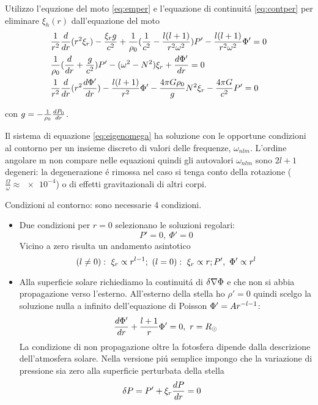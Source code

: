 \documentclass[../main.tex]{subfiles}
\begin{document}
Utilizzo l'equzione del moto \eqref{eq:emper} e l'equazione di continuit\'a \eqref{eq:contper} per eliminare $\xi_h(r)$ dall'equazione del moto
\begin{align}
&\frac{1}{r^2}\TDof{r}(r^2\xi_r)-\frac{\xi_rg}{c^2}+\frac{1}{\rho_0}(\frac{1}{c^2}-\frac{l(l+1)}{r^2\omega^2})P'-\frac{l(l+1)}{r^2\omega^2}\Phi'=0\nonumber\\
&\frac{1}{\rho_0}(\TDof{r}+\frac{g}{c^2})P'-(\omega^2-N^2)\xi_r+\TDy{r}{\Phi'}=0\label{eq:eigenomega}\\
&\frac{1}{r^2}\TDof{r}(r^2\TDy{r}{\Phi'})-\frac{l(l+1)}{r^2}\Phi'-\frac{4\pi G\rho_0}{g}N^2\xi_r-\frac{4\pi G}{c^2}P'=0\nonumber
\end{align}

con $g=-\frac{1}{\rho_0}\TDy{r}{P_0}$.

Il sistema di equazione \eqref{eq:eigenomega} ha soluzione con le opportune condizioni al contorno per un insieme discreto di valori delle frequenze, $\omega_{nlm}$. L'ordine angolare m non compare nelle equazioni quindi gli autovalori $\omega_{nlm}$ sono $2l+1$ degeneri: la degenerazione \'e rimossa nel caso si tenga conto della rotazione ($\frac{\Omega}{\omega}\approx\num{e-4}$) o di effetti gravitazionali di altri corpi.

Condizioni al contorno: sono necessarie 4 condizioni.
\begin{itemize}
\item Due condizioni per $r=0$ selezionano le soluzioni regolari:
\begin{equation}
P'=0,\ \Phi'=0
\end{equation}
Vicino a zero risulta un andamento asintotico
\begin{equation}
(l\neq0):\ \xi_r\propto r\expy{l-1};\ (l=0):\ \xi_r\propto r;P',\ \Phi'\propto r^l
\end{equation}

\item Alla superficie solare richiediamo la continuit\'a di $\Lvar{\nabla\Phi}$ e che non si abbia propagazione verso l'esterno.
All'esterno della stella ho $\rho'=0$ quindi scelgo la soluzione nulla a infinito dell'equazione di Poisson $\Phi'=Ar\expy{-l-1}$:
\begin{equation}
\TDy{r}{\Phi'}+\frac{l+1}{r}\Phi'=0,\ r=\rsun{}    
\end{equation}
La condizione di non propagazione oltre la fotosfera dipende dalla descrizione dell'atmosfera solare. Nella versione pi\'u semplice impongo che la variazione di pressione sia zero alla superficie perturbata della stella
\begin{align}
&\Lvar{P}=P'+\xi_r\TDy{r}{P}=0
\end{align}
\end{itemize}
\end{document}
